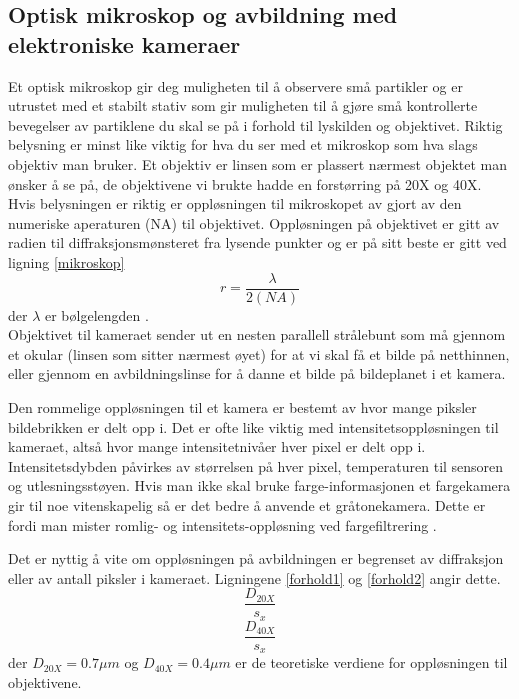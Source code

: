 \documentclass[norsk,a4paper,12pt]{article}
\begin{document}
\subsection{Optisk mikroskop og avbildning med elektroniske kameraer}
Et optisk mikroskop gir deg muligheten til å observere små partikler og er utrustet med et stabilt stativ som gir muligheten til å gjøre små kontrollerte bevegelser av partiklene du skal se på i forhold til lyskilden og objektivet. Riktig belysning er minst like viktig for hva du ser med et mikroskop som hva slags objektiv man bruker. Et objektiv er linsen som er plassert nærmest objektet man ønsker å se på, de objektivene vi brukte hadde en forstørring på 20X og 40X. Hvis belysningen er riktig er oppløsningen til mikroskopet av gjort av den numeriske aperaturen (NA) til objektivet. Oppløsningen på objektivet er gitt av radien til diffraksjonsmønsteret fra lysende punkter og er på sitt beste er gitt ved ligning \vref{mikroskop}
\begin{equation}
r = \frac{\lambda}{2(NA)}
\label{mikroskop}
\end{equation}
der $\lambda$ er bølgelengden \cite{opg}. \\

Objektivet til kameraet sender ut en nesten parallell strålebunt som må gjennom et okular (linsen som sitter nærmest øyet) for at vi skal få et bilde på netthinnen, eller gjennom en avbildningslinse for å danne et bilde på bildeplanet i et kamera. 

Den rommelige oppløsningen til et kamera er bestemt av hvor mange piksler bildebrikken er delt opp i. Det er ofte like viktig med intensitetsoppløsningen til kameraet, altså hvor mange intensitetnivåer hver pixel er delt opp i. Intensitetsdybden påvirkes av størrelsen på hver pixel, temperaturen til sensoren og utlesningsstøyen. Hvis man ikke skal bruke farge-informasjonen et fargekamera gir til noe vitenskapelig så er det bedre å anvende et gråtonekamera. Dette er fordi man mister romlig- og intensitets-oppløsning ved fargefiltrering \cite{opg}.

Det er nyttig å vite om oppløsningen på avbildningen er begrenset av diffraksjon eller av antall piksler i kameraet. Ligningene \vref{forhold1} og \ref{forhold2} angir dette.
\begin{equation}
\frac{D_{20X}}{s_x}
\label{forhold1}
\end{equation}
\begin{equation}
\frac{D_{40X}}{s_x}
\label{forhold2}
\end{equation}
der $D_{20X} = 0.7\mu m$ og $D_{40X} = 0.4\mu m$ er de teoretiske verdiene for oppløsningen til objektivene. 
\end{document}
